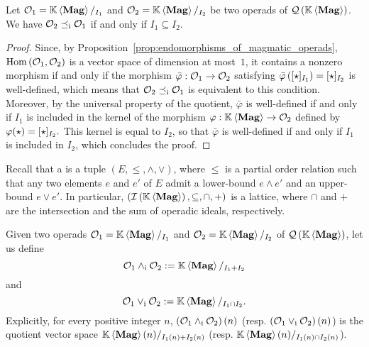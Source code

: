 \begin{Proposition} \label{prop:order_relations_on_QMag_and_ideals}
    Let $\mathcal{O}_1=\mathbb{K} \left\langle\mathbf{Mag}\right\rangle/_{I_1}$ and $\mathcal{O}_2=\mathbb{K} \left\langle\mathbf{Mag}\right\rangle/_{I_2}$ be two operads
    of $\mathcal{Q}\left(\mathbb{K} \left\langle\mathbf{Mag}\right\rangle\right)$. We have $\mathcal{O}_2\preceq_{\mathrm{i}}\mathcal{O}_1$ if and only if
    $I_1\subseteq I_2$.
\end{Proposition}
\begin{proof}
    Since, by Proposition~\ref{prop:endomorphisms_of_magmatic_operads},
    $\mathrm{Hom}\left(\mathcal{O}_1,\mathcal{O}_2\right)$ is a vector space of
    dimension at most~$1$, it contains a nonzero morphism if and only if
    the morphism $\bar{\varphi}:\mathcal{O}_1\to\mathcal{O}_2$ satisfying
    \begin{math}
        \bar{\varphi}\left([\operatorname{\star}]_{I_1}\right) = [\operatorname{\star}]_{I_2}
    \end{math}
    is well-defined, which means that $\mathcal{O}_2\preceq_{\mathrm{i}}\mathcal{O}_1$ is
    equivalent to this condition. Moreover, by the universal property
    of the quotient, $\bar{\varphi}$ is well-defined if and only if
    $I_1$ is included in the kernel of the morphism
    $\varphi:\mathbb{K} \left\langle\mathbf{Mag}\right\rangle\to\mathcal{O}_2$ defined by
    \begin{math}
        \varphi(\operatorname{\star}) = [\operatorname{\star}]_{I_2}.
    \end{math}
    This kernel is equal to $I_2$, so that $\bar{\varphi}$ is
    well-defined if and only if $I_1$ is included in $I_2$, which
    concludes the proof.
\end{proof}
\medbreak

Recall that a  is a tuple
$\left(E,\leq,\wedge,\vee\right)$, where $\leq$ is a partial order
relation such that any two elements $e$ and $e'$ of $E$ admit a
lower-bound $e\wedge e'$ and an upper-bound $e\vee e'$. In particular,
$\left(\mathcal{I}\left(\mathbb{K} \left\langle\mathbf{Mag}\right\rangle\right),\subseteq,\cap,+\right)$ is a lattice, where $\cap$ and $+$
are the intersection and the sum of operadic ideals, respectively.
\medbreak

Given two operads $\mathcal{O}_1=\mathbb{K} \left\langle\mathbf{Mag}\right\rangle/_{I_1}$ and $\mathcal{O}_2=\mathbb{K} \left\langle\mathbf{Mag}\right\rangle/_{I_2}$ of
$\mathcal{Q}\left(\mathbb{K} \left\langle\mathbf{Mag}\right\rangle\right)$, let us define
\begin{equation} \label{equ:inf_QMag}
    \mathcal{O}_1\wedge_{\mathrm{i}} \mathcal{O}_2 := \mathbb{K} \left\langle\mathbf{Mag}\right\rangle/_{I_1+I_2}
\end{equation}
and
\begin{equation} \label{equ:sup_QMag}
    \mathcal{O}_1\vee_{\mathrm{i}} \mathcal{O}_2 := \mathbb{K} \left\langle\mathbf{Mag}\right\rangle/_{I_1\cap I_2}.
\end{equation}
Explicitly, for every positive integer $n$,
$\left(\mathcal{O}_1\wedge_{\mathrm{i}}\mathcal{O}_2\right)(n)$ (resp.
$\left(\mathcal{O}_1\vee_{\mathrm{i}}\mathcal{O}_2\right)(n)$) is the quotient vector space
$\mathbb{K} \left\langle\mathbf{Mag}\right\rangle(n)/_{I_1(n)+I_2(n)}$ (resp.
$\mathbb{K} \left\langle\mathbf{Mag}\right\rangle(n)/_{I_1(n)\cap I_2(n)}$).
\medbreak

